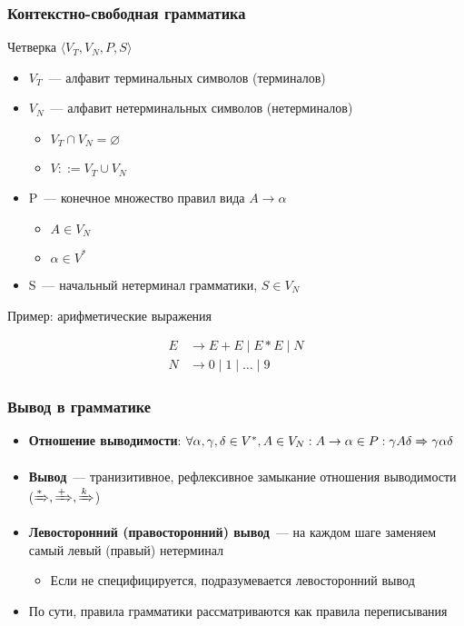 \documentclass{beamer}
\newcommand{\derives}[1][*]{\xRightarrow[]{#1}}
\begin{document}
\begin{frame}[fragile]
  \transwipe[direction=90]
  \frametitle{Контекстно-свободная грамматика}

  \begin{center}
    Четверка $\langle V_T, V_N, P, S \rangle$
  \end{center}

   \begin{itemize}
     \item $V_T$~--- алфавит терминальных символов (терминалов)
     \item $V_N$~--- алфавит нетерминальных символов (нетерминалов)
     \begin{itemize}
        \item $V_T \cap V_N = \varnothing$
        \item $V ::= V_T \cup V_N$
     \end{itemize}
     \item P~--- конечное множество правил вида $A \to \alpha$
     \begin{itemize}
       \item $A \in V_N $
       \item $\alpha \in V^*$
     \end{itemize}
     \item S~--- начальный нетерминал грамматики, $S  \in V_N$
  \end{itemize}

\vfill

\begin{center}
  Пример: арифметические выражения
\end{center}
\begin{align*}
  E &\to E + E \mid E * E \mid N \\
  N &\to 0 \mid 1 \mid \dots \mid 9
\end{align*}
\end{frame}

\begin{frame}[fragile]
  \transwipe[direction=90]
  \frametitle{Вывод в грамматике}
  \begin{itemize}
    \item \textbf{Отношение выводимости}: $\forall \alpha, \gamma, \delta \in V^*, A \in V_N: A \to \alpha \in P: \gamma A \delta \derives[] \gamma \alpha \delta$
    \item \textbf{Вывод}~--- транизитивное, рефлексивное замыкание отношения выводимости ($\derives, \derives[+], \derives[k]$)
    \item \textbf{Левосторонний (правосторонний) вывод}~--- на каждом шаге заменяем самый левый (правый) нетерминал
    \begin{itemize}
      \item Если не специфицируется, подразумевается левосторонний вывод
    \end{itemize}
    \item По сути, правила грамматики рассматриваются как правила переписывания
  \end{itemize}
\end{frame}
\end{document}

